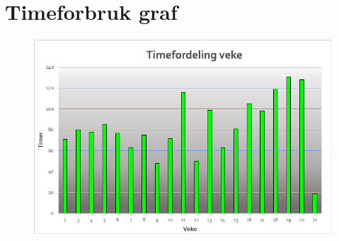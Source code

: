 \section{Timeforbruk graf}
\begin{figure}[htbp]
    \thispagestyle{fancy}
    \centering
    \includegraphics[width=\textwidth]{Vedlegg/TimelisteGraf.png}
\end{figure}









